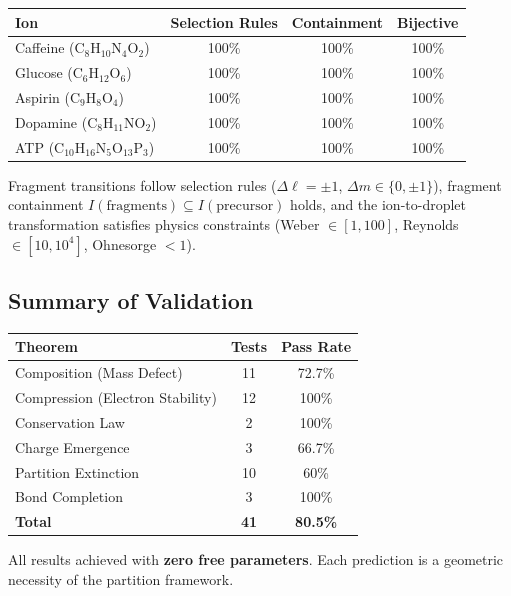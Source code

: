 \documentclass[twocolumn,10pt,a4paper]{article}
\theoremstyle{definition}
\theoremstyle{remark}
\begin{document}
\begin{center}
\begin{tabular}{lccc}
\toprule
Ion & Selection Rules & Containment & Bijective \\
\midrule
Caffeine (C$_8$H$_{10}$N$_4$O$_2$) & 100\% & 100\% & 100\% \\
Glucose (C$_6$H$_{12}$O$_6$) & 100\% & 100\% & 100\% \\
Aspirin (C$_9$H$_8$O$_4$) & 100\% & 100\% & 100\% \\
Dopamine (C$_8$H$_{11}$NO$_2$) & 100\% & 100\% & 100\% \\
ATP (C$_{10}$H$_{16}$N$_5$O$_{13}$P$_3$) & 100\% & 100\% & 100\% \\
\bottomrule
\end{tabular}
\end{center}

Fragment transitions follow selection rules ($\Delta \ell = \pm 1$, $\Delta m \in \{0, \pm 1\}$), fragment containment $I(\text{fragments}) \subseteq I(\text{precursor})$ holds, and the ion-to-droplet transformation satisfies physics constraints (Weber $\in [1,100]$, Reynolds $\in [10, 10^4]$, Ohnesorge $<1$).


\subsection{Summary of Validation}

\begin{center}
\begin{tabular}{lcc}
\toprule
Theorem & Tests & Pass Rate \\
\midrule
Composition (Mass Defect) & 11 & 72.7\% \\
Compression (Electron Stability) & 12 & 100\% \\
Conservation Law & 2 & 100\% \\
Charge Emergence & 3 & 66.7\% \\
Partition Extinction & 10 & 60\% \\
Bond Completion & 3 & 100\% \\
\midrule
\textbf{Total} & \textbf{41} & \textbf{80.5\%} \\
\bottomrule
\end{tabular}
\end{center}

All results achieved with \textbf{zero free parameters}. Each prediction is a geometric necessity of the partition framework.
\end{document}
